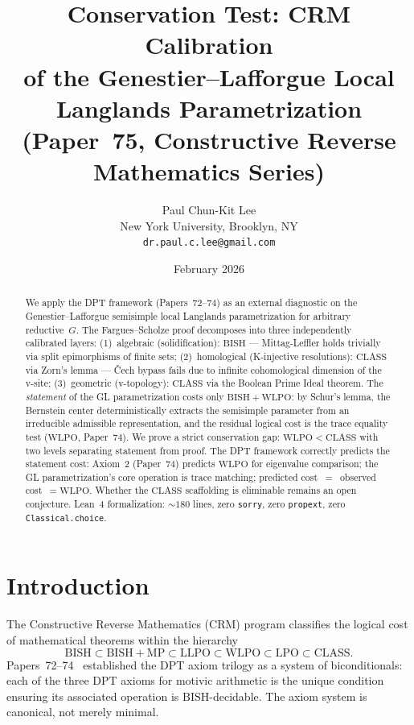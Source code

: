 \documentclass[12pt, a4paper]{article}
\title{Conservation Test: CRM Calibration\\
of the Genestier--Lafforgue Local Langlands Parametrization\\[6pt]
\large (Paper~75, Constructive Reverse Mathematics Series)}
\author{Paul Chun-Kit Lee\\
\small New York University, Brooklyn, NY\\
\small \texttt{dr.paul.c.lee@gmail.com}}
\date{February 2026}
\theoremstyle{plain}
\theoremstyle{definition}
\theoremstyle{remark}
\newcommand{\BISH}{\mathrm{BISH}}
\newcommand{\LLPO}{\mathrm{LLPO}}
\newcommand{\WLPO}{\mathrm{WLPO}}
\newcommand{\LPO}{\mathrm{LPO}}
\newcommand{\CLASS}{\mathrm{CLASS}}
\newcommand{\CRM}{\mathrm{CRM}}
\begin{document}
\maketitle

\begin{abstract}
We apply the DPT framework (Papers~72--74) as an external diagnostic
on the Genestier--Lafforgue semisimple local Langlands parametrization
for arbitrary reductive~$G$.  The Fargues--Scholze proof decomposes
into three independently calibrated layers:
(1)~algebraic (solidification): $\BISH$ --- Mittag-Leffler holds
trivially via split epimorphisms of finite sets;
(2)~homological (K-injective resolutions): $\CLASS$ via Zorn's
lemma --- \v{C}ech bypass fails due to infinite cohomological
dimension of the v-site;
(3)~geometric (v-topology): $\CLASS$ via the Boolean Prime Ideal
theorem.
The \emph{statement} of the GL parametrization costs only
$\BISH + \WLPO$: by Schur's lemma, the Bernstein center
deterministically extracts the semisimple parameter from an
irreducible admissible representation, and the residual logical
cost is the trace equality test ($\WLPO$, Paper~74).
We prove a strict conservation gap: $\WLPO < \CLASS$ with
two levels separating statement from proof.
The DPT framework correctly predicts the statement cost:
Axiom~2 (Paper~74) predicts $\WLPO$ for eigenvalue comparison;
the GL parametrization's core operation is trace matching;
predicted cost~$= $~observed cost~$= \WLPO$.
Whether the $\CLASS$ scaffolding is eliminable remains an
open conjecture.
Lean~4 formalization: ${\sim}180$ lines, zero \texttt{sorry},
zero \texttt{propext}, zero \texttt{Classical.choice}.
\end{abstract}

\section{Introduction}\label{sec:intro}

The Constructive Reverse Mathematics ($\CRM$) program classifies
the logical cost of mathematical theorems within the hierarchy
\begin{equation}\label{eq:hierarchy}
  \BISH \subset \BISH{+}\mathrm{MP} \subset \LLPO
  \subset \WLPO \subset \LPO \subset \CLASS.
\end{equation}
Papers~72--74~\cite{lee-p72, lee-p73, lee-p74} established the DPT
axiom trilogy as a system of biconditionals: each of the three DPT
axioms for motivic arithmetic is the unique condition ensuring its
associated operation is $\BISH$-decidable.  The axiom system is
canonical, not merely minimal.
\end{document}
